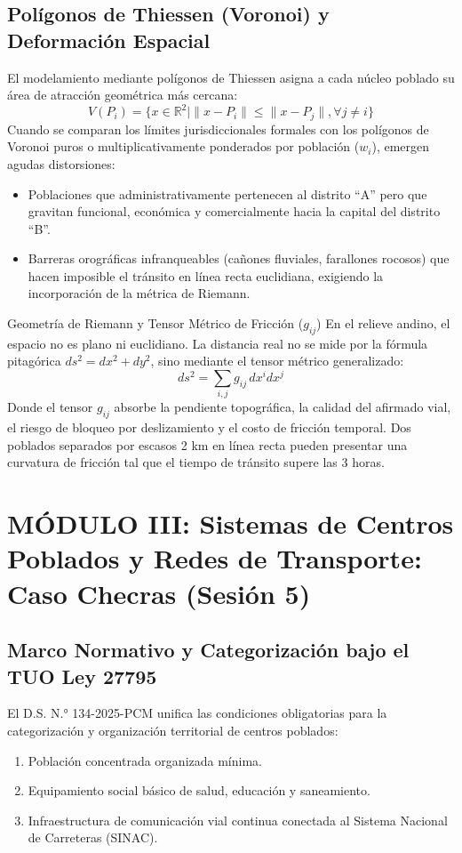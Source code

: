 \documentclass[11pt,a4paper]{article}
\begin{document}
\subsection{Polígonos de Thiessen (Voronoi) y Deformación Espacial}
El modelamiento mediante polígonos de Thiessen asigna a cada núcleo poblado su área de atracción geométrica más cercana:
\begin{equation}
    V(P_i) = \{ x \in \mathbb{R}^2 \mid \|x - P_i\| \le \|x - P_j\|, \forall j \ne i \}
\end{equation}
Cuando se comparan los límites jurisdiccionales formales con los polígonos de Voronoi puros o multiplicativamente ponderados por población ($w_i$), emergen agudas distorsiones:
\begin{itemize}
    \item Poblaciones que administrativamente pertenecen al distrito ``A'' pero que gravitan funcional, económica y comercialmente hacia la capital del distrito ``B''.
    \item Barreras orográficas infranqueables (cañones fluviales, farallones rocosos) que hacen imposible el tránsito en línea recta euclidiana, exigiendo la incorporación de la métrica de Riemann.
\end{itemize}

\begin{conceptbox}{Geometría de Riemann y Tensor Métrico de Fricción ($g_{ij}$)}
En el relieve andino, el espacio no es plano ni euclidiano. La distancia real no se mide por la fórmula pitagórica $ds^2 = dx^2 + dy^2$, sino mediante el tensor métrico generalizado:
\begin{equation}
    ds^2 = \sum_{i,j} g_{ij} \, dx^i dx^j
\end{equation}
Donde el tensor $g_{ij}$ absorbe la pendiente topográfica, la calidad del afirmado vial, el riesgo de bloqueo por deslizamiento y el costo de fricción temporal. Dos poblados separados por escasos 2 km en línea recta pueden presentar una curvatura de fricción tal que el tiempo de tránsito supere las 3 horas.
\end{conceptbox}

\newpage
\section{MÓDULO III: Sistemas de Centros Poblados y Redes de Transporte: Caso Checras (Sesión 5)}

\subsection{Marco Normativo y Categorización bajo el TUO Ley 27795}
El D.S. N.° 134-2025-PCM unifica las condiciones obligatorias para la categorización y organización territorial de centros poblados:
\begin{enumerate}
    \item Población concentrada organizada mínima.
    \item Equipamiento social básico de salud, educación y saneamiento.
    \item Infraestructura de comunicación vial continua conectada al Sistema Nacional de Carreteras (SINAC).
\end{enumerate}
\end{document}
